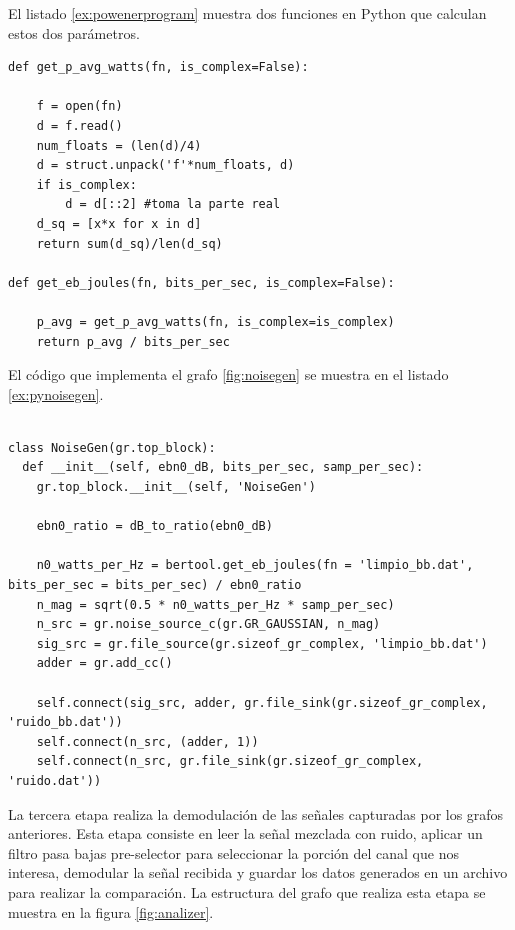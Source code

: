El listado \ref{ex:powenerprogram} muestra dos funciones en Python que calculan estos dos
par\'ametros.

\begin{lstlisting}[float, label=ex:powenerprogram, caption={Funciones en Python para calcular la
potencia y la energia promedio de una se\~nal}]
def get_p_avg_watts(fn, is_complex=False):

    f = open(fn)
    d = f.read()
    num_floats = (len(d)/4)
    d = struct.unpack('f'*num_floats, d)
    if is_complex:
        d = d[::2] #toma la parte real
    d_sq = [x*x for x in d]
    return sum(d_sq)/len(d_sq)
    
def get_eb_joules(fn, bits_per_sec, is_complex=False):

    p_avg = get_p_avg_watts(fn, is_complex=is_complex)
    return p_avg / bits_per_sec

\end{lstlisting}

El c\'odigo que implementa el grafo \ref{fig:noisegen} se muestra en el listado \ref{ex:pynoisegen}.

\begin{lstlisting}[float, label=ex:pynoisegen, caption={C\'odigo que implementa el grafo generador
de ruido}, breaklines=true]

class NoiseGen(gr.top_block):
  def __init__(self, ebn0_dB, bits_per_sec, samp_per_sec):
    gr.top_block.__init__(self, 'NoiseGen')

    ebn0_ratio = dB_to_ratio(ebn0_dB)

    n0_watts_per_Hz = bertool.get_eb_joules(fn = 'limpio_bb.dat', bits_per_sec = bits_per_sec) / ebn0_ratio 
    n_mag = sqrt(0.5 * n0_watts_per_Hz * samp_per_sec)
    n_src = gr.noise_source_c(gr.GR_GAUSSIAN, n_mag)
    sig_src = gr.file_source(gr.sizeof_gr_complex, 'limpio_bb.dat')
    adder = gr.add_cc()

    self.connect(sig_src, adder, gr.file_sink(gr.sizeof_gr_complex, 'ruido_bb.dat'))
    self.connect(n_src, (adder, 1))
    self.connect(n_src, gr.file_sink(gr.sizeof_gr_complex, 'ruido.dat'))
\end{lstlisting}

La tercera etapa realiza la demodulaci\'on de las se\~nales capturadas por los grafos anteriores.
Esta etapa consiste en leer la se\~nal mezclada con ruido, aplicar un filtro pasa bajas pre-selector
para seleccionar la porci\'on del canal que nos interesa, demodular la se\~nal recibida y guardar los
datos generados en un archivo para realizar la comparaci\'on. La estructura del grafo que realiza esta
etapa se muestra en la figura \ref{fig:analizer}.

